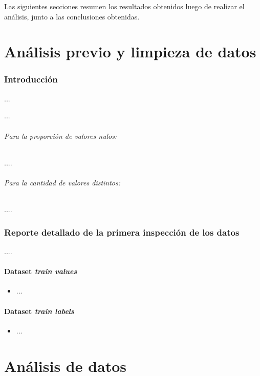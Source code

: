 \documentclass[a4paper,12pt]{article}
\begin{document}
\par
Las siguientes secciones resumen los resultados obtenidos luego de realizar el análisis, junto a las conclusiones obtenidas.

\newpage

\part{Análisis previo y limpieza de datos}

\section{Introducción}

\par
...

\par ...

\paragraph{Para la proporción de valores nulos:} ....

\paragraph{Para la cantidad de valores distintos:}....

\section{Reporte detallado de la primera inspección de los datos}
....

\subsection{Dataset \textit{train values}}
\begin{itemize}
    \item ...
\end{itemize}

\subsection{Dataset \textit{train labels}}
\begin{itemize}
    \item ...
\end{itemize}

\newpage

\part{Análisis de datos}
\end{document}
